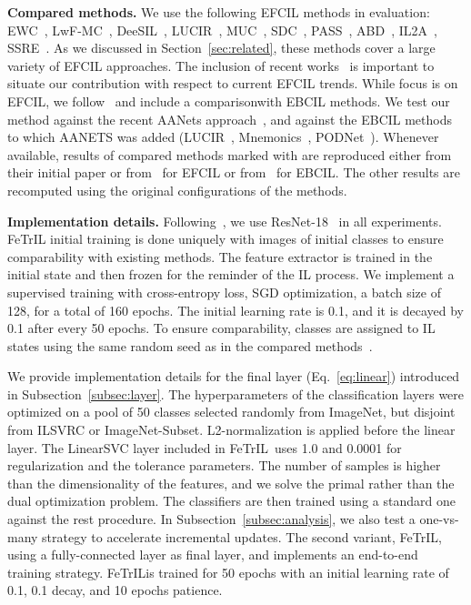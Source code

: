 \documentclass[10pt,twocolumn,letterpaper]{article}
\makeatletter
\newcommand{\ourmodel}{FeTrIL\@\xspace}
\newcommand{\ourmodelone}{FeTrIL~}
\newcommand{\ourmodeloneFcNospace}{FeTrIL}
\makeatother
\begin{document}
\textbf{Compared methods.} We use the following EFCIL methods in evaluation: EWC~\cite{kirkpatrick2017overcoming}, LwF-MC~\cite{rebuffi2017_icarl}, DeeSIL~\cite{belouadah2018_deesil}, LUCIR~\cite{hou2019_lucir}, MUC~\cite{liu2020more}, SDC~\cite{sdc_2020}, PASS~\cite{zhu2021pass}, ABD~\cite{smith2021always}, IL2A~\cite{zhu2021class}, SSRE~\cite{zhu2022self}.
As we discussed in Section~\ref{sec:related}, these methods cover a large variety of EFCIL approaches.
The inclusion of recent works~\cite{zhu2021class,zhu2021pass,zhu2022self} is important to situate our contribution with respect to current EFCIL trends. 
While focus is on EFCIL, we follow~\cite{zhu2022self} and include a comparisonwith EBCIL methods. 
We test our method against the recent AANets approach~\cite{liu2021aanets}, and against the EBCIL methods to which AANETS was added (LUCIR~\cite{hou2019_lucir}, Mnemonics~\cite{mnemonics_2020}, PODNet~\cite{douillard2020podnet}).
Whenever available, results of compared methods marked with  are reproduced either from their initial paper or from~\cite{zhu2022self} for EFCIL or from~\cite{liu2021aanets} for EBCIL. 
The other results are recomputed using the original 
configurations of the methods.

\textbf{Implementation details.} Following~\cite{rebuffi2017_icarl,zhu2021class,zhu2021pass,zhu2022self}, we use ResNet-18~\cite{he2016_resnet} in all experiments.
\ourmodel initial training is done uniquely with images of initial classes to ensure comparability with existing methods.
The feature extractor is trained in the initial state and then frozen for the reminder of the IL process. 
We implement a supervised training with cross-entropy loss, SGD optimization, a batch size of 128, for a total of 160 epochs.
The initial learning rate is 0.1, and it is decayed by 0.1 after every 50 epochs. 
To ensure comparability, classes are assigned to IL states using the same random seed as in the compared methods~\cite{hou2019_lucir,zhu2021pass,zhu2021class,zhu2022self}. 

We provide implementation details for the final layer (Eq.~\ref{eq:linear}) introduced in Subsection~\ref{subsec:layer}.
The hyperparameters of the classification layers were optimized on a pool of 50 classes selected randomly from ImageNet, but disjoint from ILSVRC or ImageNet-Subset. 
L2-normalization is applied before the linear layer.
The LinearSVC layer included in \ourmodelone uses 1.0 and 0.0001 for 
regularization and the tolerance parameters.
The number of samples is higher than the dimensionality of the features, and we solve the primal rather than the dual optimization problem.
The classifiers are then trained using a standard one against the rest procedure.
In Subsection~\ref{subsec:analysis}, we also test a one-vs-many strategy to accelerate incremental updates.
The second variant, \ourmodeloneFcNospace, using a fully-connected layer as final layer, and implements an end-to-end training strategy. 
\ourmodeloneFcNospace is trained for 50 epochs with an initial learning rate of 0.1, 0.1 decay, and 10 epochs patience.
\end{document}
